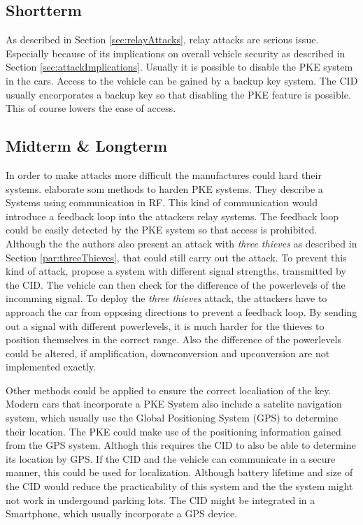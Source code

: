 
\subsection{Shortterm}
	As described in Section \ref{sec:relayAttacks}, relay attacks are serious issue.
	Especially because of its implications on overall vehicle security as described in Section \ref{sec:attackImplications}.
	Usually it is possible to disable the PKE system in the cars.
	Access to the vehicle can be gained by a backup key system.
	The CID usually encorporates a backup key so that disabling the PKE feature is possible.
	This of course lowers the ease of access.

\subsection{Midterm \& Longterm}
	In order to make attacks more difficult the manufactures could hard their systems.
	\citeauthor{someAttacksPKES} elaborate som methods to harden PKE systems.
	They describe a Systems using communication in RF.
	This kind of communication would introduce a feedback loop into the attackers relay systems.
	The feedback loop could be easily detected by the PKE system so that access is prohibited.
	Although the the authors also present an attack with \textsl{three thieves}
	as described in Section \ref{par:threeThieves}, that could still
	carry out the attack.
	To prevent this kind of attack,
	\citeauthor{someAttacksPKES} propose a system with different signal strengths,
	transmitted by the CID.
	The vehicle can then check for the difference of the powerlevels of the incomming signal.
	To deploy the \textsl{three thieves} attack,
	the attackers have to approach the car from opposing directions to prevent a feedback loop.
	By sending out a signal with different powerlevels,
	it is much harder for the thieves to position themselves in the correct range.
	Also the difference of the powerlevels could be altered,
	if amplification, downconversion and upconversion are not implemented exactly.

	Other methods could be applied to ensure the correct localiation of the key.
	Modern cars that incorporate a PKE System also include a satelite navigation system,
	which usually use the Global Positioning System (GPS) to determine their location.
	The PKE could make use of the positioning information gained from the GPS system.
	Althogh this requires the CID to also be able to determine its location by GPS.
	If the CID and the vehicle can communicate in a secure manner,
	this could be used for localization.
	Although battery lifetime and size of the CID would reduce the practicability of this system
	and the the system might not work in undergound parking lots.
	The CID might be integrated in a Smartphone,
	which usually incorporate a GPS device.

